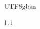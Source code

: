 \documentclass[11pt,a4paper,sans]{moderncv}   %
\begin{document}
\begin{CJK}{UTF8}{gbsn}
\begin{spacing}{1.1}
%

\end{spacing}
\clearpage\end{CJK}
\end{document}
